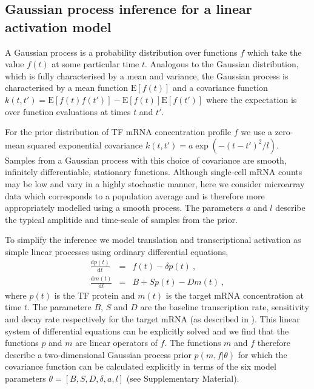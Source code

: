 \documentclass{pnastwo}
\begin{document}
\begin{article}
\section{Gaussian process inference for a linear activation model}

A Gaussian process is a probability distribution over
functions $f$ which take the value $f(t)$ at some particular time
$t$. Analogous to the Gaussian distribution, which is fully characterised by a mean and variance, the Gaussian process is
characterised by a mean function $\mathrm{E}[f(t)]$ and a covariance
function $k(t,t')=\mathrm{E}[f(t)f(t')]-\mathrm{E}[f(t)]\mathrm{E}[f(t')]$
where the expectation is over function evaluations at times $t$ and
$t'$. 

For the prior distribution of TF mRNA concentration profile $f$ we use a zero-mean squared exponential covariance
$k(t,t')=a\exp(-(t-t')^2/l)$. Samples from a Gaussian process with this choice
of covariance are smooth, infinitely differentiable, stationary functions. Although single-cell mRNA counts may be low
and vary in a highly stochastic manner, here we consider microarray data which
corresponds to a population average and is therefore more
appropriately modelled using a smooth process. The parameters $a$ and
$l$ describe the typical amplitide and time-scale of samples from
the prior. 

To simplify the inference we model translation and transcriptional
activation as simple linear processes using ordinary differential
equations,
\begin{eqnarray*}
\frac{\mathrm{d}p(t)}{\mathrm{d}t} & = & f(t) - \delta
  p(t) \ , \\
\frac{\mathrm{d}m(t)}{\mathrm{d}t} & = & B+Sp(t)-Dm(t) \ ,
\end{eqnarray*}
where $p(t)$ is the TF protein and $m(t)$ is the target mRNA
concentration at time $t$. The parametere $B$, $S$ and $D$ are the
baseline transcription rate, sensitivity and decay rate respectively
for the target mRNA (as described in \cite{Barenco2006a}). This linear system of differential equations can be
explicitly solved and we find that the functions $p$ and $m$ are
linear operators of $f$. The functions $m$ and $f$ therefore
describe a two-dimensional Gaussian process prior $p(m,f|\theta)$
for which the covariance function can be calculated explicitly in terms of the
six model parameters $\theta=[B,S,D,\delta,a,l]$ (see
Supplementary Material). 


\end{article}
\end{document}
